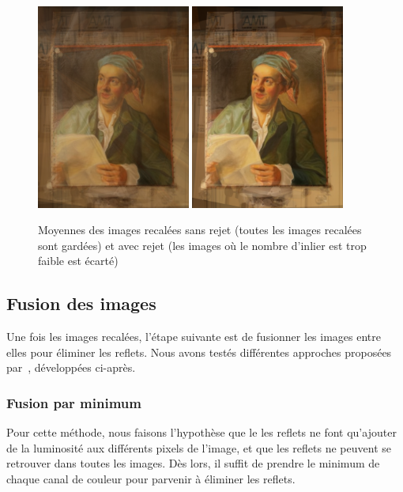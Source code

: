 \documentclass[12pt,a4paper]{article}
\begin{document}
\begin{figure}[H]
  \centering
  \includegraphics[width=0.45\textwidth]{Fig/merge_no_rejection.png}
  \includegraphics[width=0.45\textwidth]{Fig/merge_rejection.png}
  \caption{Moyennes des images recalées sans rejet (toutes les images recalées sont gardées) et avec rejet (les images où le nombre d'inlier est trop faible est écarté)}
\end{figure}

\subsection{Fusion des images}
Une fois les images recalées, l'étape suivante est de fusionner les images entre elles pour éliminer les reflets. Nous avons testés différentes approches proposées par~\citep{haro2012photographing}, développées ci-après.
\subsubsection{Fusion par minimum}
Pour cette méthode, nous faisons l'hypothèse que le les reflets ne font qu'ajouter de la luminosité aux différents pixels de l'image, et que les reflets ne peuvent se retrouver dans toutes les images. Dès lors, il suffit de prendre le minimum de chaque canal de couleur pour parvenir à éliminer les reflets.
\end{document}
